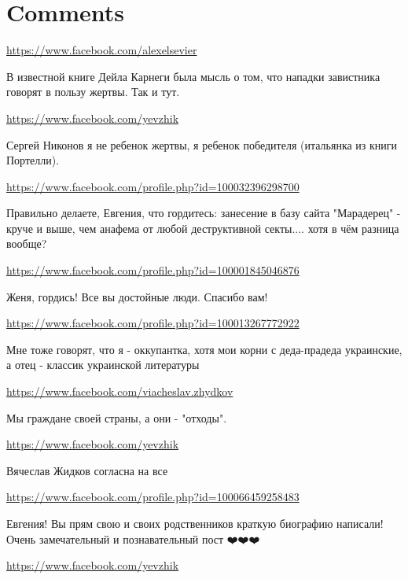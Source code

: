 \documentclass[a4paper,11pt]{extreport}
\begin{document}
\section{Comments}
\begin{itemize}
\url{https://www.facebook.com/alexelsevier}

В известной книге Дейла Карнеги была мысль о том, что нападки завистника говорят в пользу жертвы. Так и тут.

\begin{itemize}
\url{https://www.facebook.com/yevzhik}

Сергей Никонов я не ребенок жертвы, я ребенок победителя (итальянка из книги Портелли).

\end{itemize}
\url{https://www.facebook.com/profile.php?id=100032396298700}

Правильно делаете, Евгения, что гордитесь: занесение в базу сайта "Марадерец" - круче и выше, чем анафема от любой деструктивной секты.... хотя в чём разница вообще?

\url{https://www.facebook.com/profile.php?id=100001845046876}

Женя, гордись! Все вы достойные люди. Спасибо вам!

\url{https://www.facebook.com/profile.php?id=100013267772922}

Мне тоже говорят, что я - оккупантка, хотя мои корни с деда-прадеда украинские, а отец - классик украинской литературы

\url{https://www.facebook.com/viacheslav.zhydkov}

Мы граждане своей страны, а они - "отходы".

\begin{itemize}
\url{https://www.facebook.com/yevzhik}

Вячеслав Жидков согласна на все 💯

\end{itemize}
\url{https://www.facebook.com/profile.php?id=100066459258483}

Евгения!
Вы прям свою и своих родственников краткую биографию написали!
Очень замечательный и познавательный пост ❤️❤️❤️

\begin{itemize}
\url{https://www.facebook.com/yevzhik}


\end{itemize}
\end{itemize}
\end{document}
